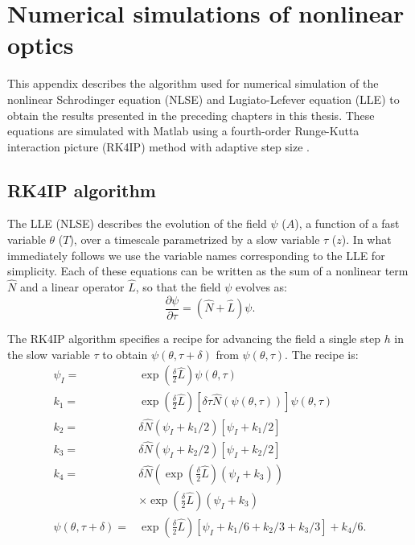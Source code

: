 \chapter{Numerical simulations of nonlinear optics}
 \label{app:numericalsims}



This appendix describes the algorithm used for numerical simulation of the nonlinear Schrodinger equation (NLSE) and Lugiato-Lefever equation (LLE) to obtain the results presented in the preceding chapters in this thesis. These equations are simulated with Matlab using a fourth-order Runge-Kutta interaction picture (RK4IP) method \cite{Hult2007} with adaptive step size \cite{Heidt2009}.

\section{RK4IP algorithm}

The LLE (NLSE) describes the evolution of the field $\psi$ ($A$), a function of a fast variable $\theta$ ($T$), over a timescale parametrized by a slow variable $\tau$ ($z$). In what immediately follows we use the variable names corresponding to the LLE for simplicity. Each of these equations can be written as the sum of a nonlinear term $\hat{N}$ and a linear operator $\hat{L}$, so that the field $\psi$ evolves as:
\begin{equation}
\frac{\partial\psi}{\partial\tau}=(\hat{N}+\hat{L})\psi.
\end{equation}

The RK4IP algorithm specifies a recipe for advancing the field a single step $h$ in the slow variable $\tau$ to obtain $\psi(\theta,\tau+\delta)$ from $\psi(\theta,\tau)$. The recipe is:
\begin{align}
\psi_I=&\exp\left(\frac{\delta}{2}\hat{L}\right)\psi(\theta,\tau) \\
k_1=&\exp\left(\frac{\delta}{2}\hat{L}\right)\left[\delta\tau\hat{N}(\psi(\theta,\tau))\right]\psi(\theta,\tau) \\
k_2=&\delta\hat{N}(\psi_I+k_1/2)\left[\psi_I+k_1/2\right] \\
k_3=&\delta\hat{N}(\psi_I+k_2/2)\left[\psi_I+k_2/2\right] \\
k_4=&\delta\hat{N}\left(\exp\left(\frac{\delta}{2}\hat{L}\right)(\psi_I+k_3)\right) \\
&\times\exp\left(\frac{\delta}{2}\hat{L}\right)(\psi_I+k_3)\\
\psi(\theta,\tau+\delta)=&\exp\left(\frac{\delta}{2}\hat{L}\right)[\psi_I+k_1/6+k_2/3+k_3/3]+k_4/6.
\end{align}

